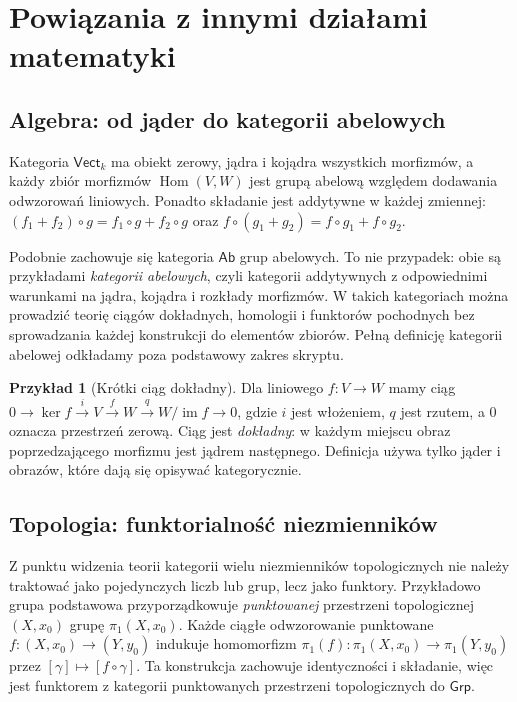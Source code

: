 \documentclass[11pt,a4paper]{article}
\numberwithin{equation}{section}
\theoremstyle{plain}
\theoremstyle{definition}
\newtheorem{przyklad}[twierdzenie]{Przykład}
\theoremstyle{remark}
\newcommand{\cat}[1]{\mathsf{#1}}
\newcommand{\Grp}{\cat{Grp}}
\newcommand{\Vect}{\cat{Vect}}
\newcommand{\Ab}{\cat{Ab}}
\newcommand{\Hom}{\operatorname{Hom}}
\newcommand{\im}{\operatorname{im}}
\newcommand{\Ker}{\operatorname{ker}}
\begin{document}
\section{Powiązania z innymi działami matematyki}\label{sec:powiazania}

\subsection{Algebra: od jąder do kategorii abelowych}

Kategoria $\Vect_k$ ma obiekt zerowy, jądra i kojądra wszystkich morfizmów, a każdy zbiór morfizmów $\Hom(V,W)$ jest grupą abelową względem dodawania odwzorowań liniowych. Ponadto składanie jest addytywne w każdej zmiennej:
$(f_1+f_2)\circ g=f_1\circ g+f_2\circ g$ oraz $f\circ(g_1+g_2)=f\circ g_1+f\circ g_2$.

Podobnie zachowuje się kategoria $\Ab$ grup abelowych. To nie przypadek: obie są przykładami \emph{kategorii abelowych}, czyli kategorii addytywnych z odpowiednimi warunkami na jądra, kojądra i rozkłady morfizmów. W takich kategoriach można prowadzić teorię ciągów dokładnych, homologii i funktorów pochodnych bez sprowadzania każdej konstrukcji do elementów zbiorów. Pełną definicję kategorii abelowej odkładamy poza podstawowy zakres skryptu.

\begin{przyklad}[Krótki ciąg dokładny]
Dla liniowego $f:V\to W$ mamy ciąg $0\to\Ker f\xrightarrow{i}V\xrightarrow{f}W\xrightarrow{q}W/\im f\to0$, gdzie $i$ jest włożeniem, $q$ jest rzutem, a $0$ oznacza przestrzeń zerową. Ciąg jest \emph{dokładny}: w każdym miejscu obraz poprzedzającego morfizmu jest jądrem następnego. Definicja używa tylko jąder i obrazów, które dają się opisywać kategorycznie.
\end{przyklad}

\subsection{Topologia: funktorialność niezmienników}

Z punktu widzenia teorii kategorii wielu niezmienników topologicznych nie należy traktować jako pojedynczych liczb lub grup, lecz jako funktory. Przykładowo grupa podstawowa przyporządkowuje \emph{punktowanej} przestrzeni topologicznej $(X,x_0)$ grupę $\pi_1(X,x_0)$. Każde ciągłe odwzorowanie punktowane $f:(X,x_0)\to(Y,y_0)$ indukuje homomorfizm $\pi_1(f):\pi_1(X,x_0)\to\pi_1(Y,y_0)$ przez $[\gamma]\mapsto[f\circ\gamma]$. Ta konstrukcja zachowuje identyczności i składanie, więc jest funktorem z kategorii punktowanych przestrzeni topologicznych do $\Grp$.
\end{document}

